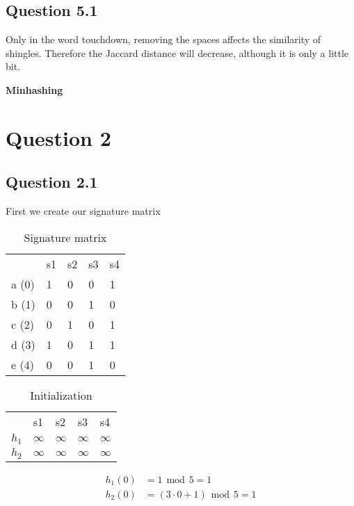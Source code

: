 \documentclass[11pt,twoside,a4paper]{article}
\begin{document}
	\subsection{Question 5.1}
		Only in the word touchdown, removing the spaces affects the similarity of shingles. Therefore the Jaccard distance will decrease, although it is only a little bit. 
		
\textbf{Minhashing}

\section{Question 2}

	\subsection{Question 2.1}
	First we create our signature matrix
	
	\begin{table}[h!]
	\centering
	\label{my-label}
	\begin{tabular}{lllll}
	 & s1 & s2 & s3 & s4 \\
	 a (0) & 1 & 0 & 0 & 1 \\
	 b (1) & 0 & 0 & 1 & 0 \\
	 c (2) & 0 & 1 & 0 & 1 \\
	 d (3) & 1 & 0 & 1 & 1 \\
	 e (4) & 0 & 0 & 1 & 0   
	\end{tabular}
	\caption{Signature matrix}
	\end{table}
	
	\begin{table}[h!]
	\centering
	\label{my-label}
	\begin{tabular}{lllll}
	 & s1 & s2 & s3 & s4 \\
	 $h_1$ & $\infty$ & $\infty$ & $\infty$ & $\infty$ \\
	 $h_2$ & $\infty$ & $\infty$ & $\infty$ & $\infty$
	\end{tabular}
	\caption{Initialization}
	\end{table}
	
	\begin{align}
		h_1(0) &= 1 \hspace{5pt} \mbox{mod} \hspace{5pt} 5 = 1 \\
		h_2(0) &= (3 \cdot 0 + 1) \hspace{5pt} \mbox{mod} \hspace{5pt} 5 = 1 
	\end{align}
	
\end{document}
